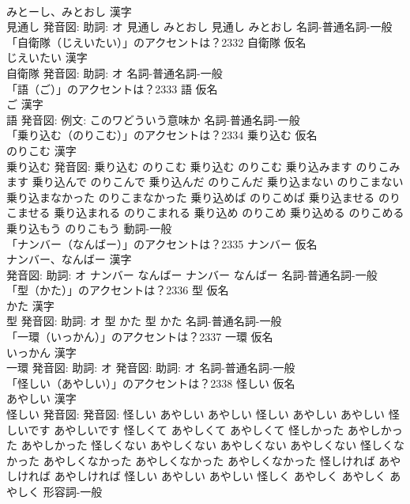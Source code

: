 \documentclass[8pt]{extreport}
\begin{document}
\begin{CJK}{UTF8}{min}
\\	みとーし、みとおし 漢字　
\\	見通し 発音図: 助詞: オ	見通し みとおし		見通し みとおし				名詞-普通名詞-一般 
\\	「自衛隊（じえいたい）」のアクセントは？2332	自衛隊 仮名　
\\	じえいたい 漢字　
\\	自衛隊 発音図: 助詞: オ							名詞-普通名詞-一般 
\\	「語（ご）」のアクセントは？2333	語 仮名　
\\	ご 漢字　
\\	語 発音図: 例文: このワどういう意味か							名詞-普通名詞-一般 
\\	「乗り込む（のりこむ）」のアクセントは？2334	乗り込む 仮名　
\\	のりこむ 漢字　
\\	乗り込む 発音図:	乗り込む のりこむ		乗り込む のりこむ 乗り込みます のりこみます 乗り込んで のりこんで 乗り込んだ のりこんだ 乗り込まない のりこまない 乗り込まなかった のりこまなかった 乗り込めば のりこめば 乗り込ませる のりこませる 乗り込まれる のりこまれる 乗り込め のりこめ 乗り込める のりこめる 乗り込もう のりこもう				動詞-一般 
\\	「ナンバー（なんばー）」のアクセントは？2335	ナンバー 仮名　
\\	ナンバー、なんばー 漢字　
\\	発音図: 助詞: オ	ナンバー なんばー		ナンバー なんばー				名詞-普通名詞-一般 
\\	「型（かた）」のアクセントは？2336	型 仮名　
\\	かた 漢字　
\\	型 発音図: 助詞: オ	型 かた		型 かた				名詞-普通名詞-一般 
\\	「一環（いっかん）」のアクセントは？2337	一環 仮名　
\\	いっかん 漢字　
\\	一環 発音図: 助詞: オ 発音図: 助詞: オ							名詞-普通名詞-一般 
\\	「怪しい（あやしい）」のアクセントは？2338	怪しい 仮名　
\\	あやしい 漢字　
\\	怪しい 発音図: 発音図:	怪しい あやしい あやしい		怪しい あやしい あやしい 怪しいです あやしいです 怪しくて あやしくて あやしくて 怪しかった あやしかった あやしかった 怪しくない あやしくない あやしくない あやしくない 怪しくなかった あやしくなかった あやしくなかった あやしくなかった 怪しければ あやしければ あやしければ 怪しい あやしい あやしい 怪しく あやしく あやしく あやしく				形容詞-一般 

\end{CJK}
\end{document}
